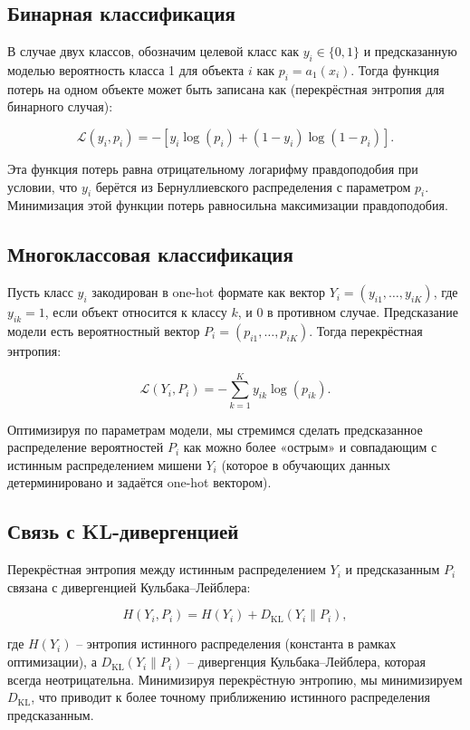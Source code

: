 \subsection*{Бинарная классификация}

В случае двух классов, обозначим целевой класс как $y_i \in \{0,1\}$ и предсказанную моделью вероятность класса 1 для объекта $i$ как $p_i = a_1(x_i)$. Тогда функция потерь на одном объекте может быть записана как (перекрёстная энтропия для бинарного случая):

$$
    \mathcal{L}(y_i, p_i) = -\left[y_i\log(p_i) + (1 - y_i)\log(1 - p_i)\right].
$$

Эта функция потерь равна отрицательному логарифму правдоподобия при условии, что $y_i$ берётся из Бернуллиевского распределения с параметром $p_i$. Минимизация этой функции потерь равносильна максимизации правдоподобия.

\subsection*{Многоклассовая классификация}

Пусть класс $y_i$ закодирован в one-hot формате как вектор $Y_i = (y_{i1}, \dots, y_{iK})$, где $y_{ik} = 1$, если объект относится к классу $k$, и 0 в противном случае. Предсказание модели есть вероятностный вектор $P_i = (p_{i1}, \dots, p_{iK})$. Тогда перекрёстная энтропия:

$$
    \mathcal{L}(Y_i, P_i) = -\sum_{k=1}^{K} y_{ik}\log(p_{ik}).
$$

Оптимизируя по параметрам модели, мы стремимся сделать предсказанное распределение вероятностей $P_i$ как можно более «острым» и совпадающим с истинным распределением мишени $Y_i$ (которое в обучающих данных детерминировано и задаётся one-hot вектором).

\subsection*{Связь с KL-дивергенцией}

Перекрёстная энтропия между истинным распределением $Y_i$ и предсказанным $P_i$ связана с дивергенцией Кульбака–Лейблера:

$$
    H(Y_i, P_i) = H(Y_i) + D_{\text{KL}}(Y_i \| P_i),
$$

где $H(Y_i)$ – энтропия истинного распределения (константа в рамках оптимизации), а $D_{\text{KL}}(Y_i \| P_i)$ – дивергенция Кульбака–Лейблера, которая всегда неотрицательна. Минимизируя перекрёстную энтропию, мы минимизируем $D_{\text{KL}}$, что приводит к более точному приближению истинного распределения предсказанным.

